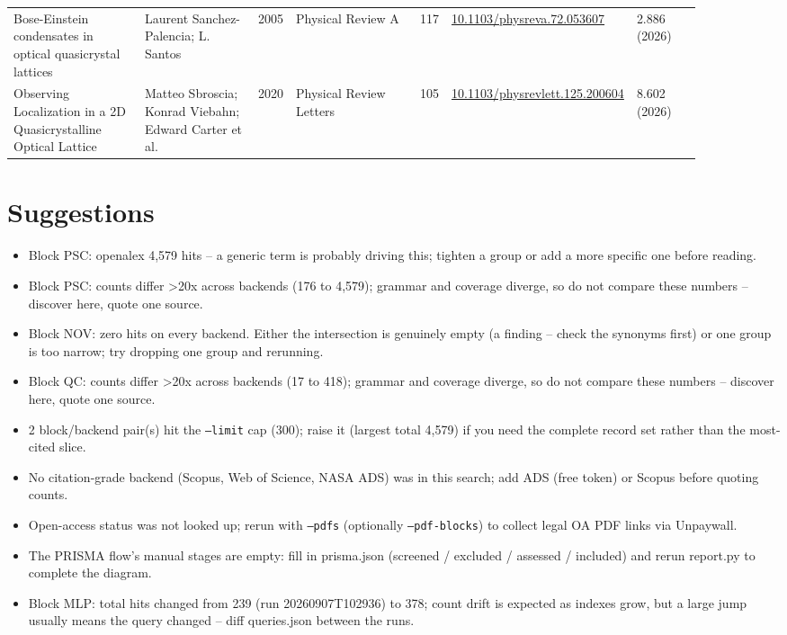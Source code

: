 \documentclass[10pt,a4paper]{article}
\begin{document}
{\begin{longtable}{p{0.204\linewidth}p{0.188\linewidth}p{0.043\linewidth}p{0.204\linewidth}p{0.043\linewidth}p{0.108\linewidth}p{0.102\linewidth}}
Bose-Einstein condensates in optical quasicrystal lattices & Laurent Sanchez-Palencia; L. Santos & 2005 & Physical Review A & 117 & \href{https://doi.org/10.1103/physreva.72.053607}{10.1103/physreva.72.053607} & 2.886 (2026) \\
Observing Localization in a 2D Quasicrystalline Optical Lattice & Matteo Sbroscia; Konrad Viebahn; Edward Carter et al. & 2020 & Physical Review Letters & 105 & \href{https://doi.org/10.1103/physrevlett.125.200604}{10.1103/physrevlett.125.200604} & 8.602 (2026) \\
\hline
\end{longtable}}
\section*{Suggestions}
\begin{itemize}\item Block PSC: openalex 4,579 hits -- a generic term is probably driving this; tighten a group or add a more specific one before reading.\item Block PSC: counts differ >20x across backends (176 to 4,579); grammar and coverage diverge, so do not compare these numbers -- discover here, quote one source.\item Block NOV: zero hits on every backend. Either the intersection is genuinely empty (a finding -- check the synonyms first) or one group is too narrow; try dropping one group and rerunning.\item Block QC: counts differ >20x across backends (17 to 418); grammar and coverage diverge, so do not compare these numbers -- discover here, quote one source.\item 2 block/backend pair(s) hit the \texttt{--limit} cap (300); raise it (largest total 4,579) if you need the complete record set rather than the most-cited slice.\item No citation-grade backend (Scopus, Web of Science, NASA ADS) was in this search; add ADS (free token) or Scopus before quoting counts.\item Open-access status was not looked up; rerun with \texttt{--pdfs} (optionally \texttt{--pdf-blocks}) to collect legal OA PDF links via Unpaywall.\item The PRISMA flow's manual stages are empty: fill in prisma.json (screened / excluded / assessed / included) and rerun report.py to complete the diagram.\item Block MLP: total hits changed from 239 (run 20260907T102936) to 378; count drift is expected as indexes grow, but a large jump usually means the query changed -- diff queries.json between the runs.\end{itemize}
\end{document}
